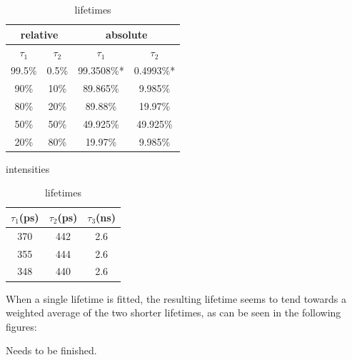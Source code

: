 \begin{table}[h]
    \centering
    \begin{subtable}[t]{0.48\textwidth}
        \flushleft
        \begin{tabular}{|c|c|c|c|}
            \hline
            \multicolumn{2}{|c|}{relative} & \multicolumn{2}{|c|}{absolute} \\
            \hline
            $\tau_1$ & $\tau_2$ & $\tau_1$    & $\tau_2$   \\
            \hline
            99.5\% & 0.5\% & 99.3508\%*  &  0.4993\%* \\
            90\%   & 10\% & 89.865\%    &  9.985\%   \\
            80\%   & 20\% & 89.88\%     & 19.97\%    \\
            50\%   & 50\% & 49.925\%    & 49.925\%   \\
            20\%   & 80\% & 19.97\%     &  9.985\%   \\
            \hline
        \end{tabular}
        \caption{intensities}
    \end{subtable}

    \hspace{\fill}

    \begin{subtable}[t]{0.48\textwidth}
        \begin{tabular}{|c|c|c|}
            \hline
            $\tau_1$(ps) & $\tau_2$(ps) & $\tau_3$(ns)\\
            \hline
            370 & 442 & 2.6 \\
            355 & 444 & 2.6 \\
            348 & 440 & 2.6 \\
            \hline
        \end{tabular}
        \caption{lifetimes}
    \end{subtable}
\end{table}

When a single lifetime is fitted, the resulting lifetime seems to tend towards a weighted average of the two shorter lifetimes, as can be seen in the following figures:

Needs to be finished.

